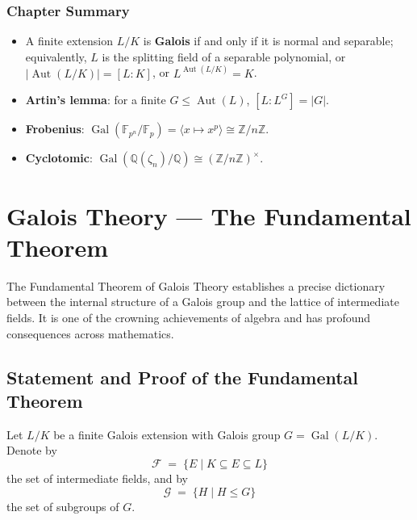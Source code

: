 \documentclass[12pt,a4paper,openany]{book}
\theoremstyle{definition}
\theoremstyle{remark}
\newcommand{\Z}{\mathbb{Z}}
\newcommand{\Q}{\mathbb{Q}}
\newcommand{\F}{\mathbb{F}}
\DeclareMathOperator{\Gal}{Gal}
\DeclareMathOperator{\Aut}{Aut}
\begin{document}
\subsection*{Chapter Summary}

\begin{itemize}
\item A finite extension $L/K$ is \textbf{Galois} if and only if it is normal
and separable; equivalently, $L$ is the splitting field of a separable
polynomial, or $|\!\Aut(L/K)|=[L:K]$, or $L^{\Aut(L/K)}=K$.
\item \textbf{Artin's lemma}: for a finite $G\leq\Aut(L)$, $[L:L^{G}]=|G|$.
\item \textbf{Frobenius}: $\Gal(\F_{p^{n}}/\F_{p})=\langle x\mapsto
x^{p}\rangle\cong\Z/n\Z$.
\item \textbf{Cyclotomic}: $\Gal(\Q(\zeta_{n})/\Q)\cong(\Z/n\Z)^{\times}$.
\end{itemize}


\chapter{Galois Theory — The Fundamental Theorem}
\label{ch:fundamental-theorem}

The Fundamental Theorem of Galois Theory establishes a precise dictionary
between the internal structure of a Galois group and the lattice of
intermediate fields.  It is one of the crowning achievements of algebra and
has profound consequences across mathematics.

\section{Statement and Proof of the Fundamental Theorem}
\label{sec:ftgt}

Let $L/K$ be a finite Galois extension with Galois group $G=\Gal(L/K)$.
Denote by
\[
  \mathcal{F} \;=\; \{E \mid K\subseteq E\subseteq L\}
\]
the set of intermediate fields, and by
\[
  \mathcal{G} \;=\; \{H \mid H\leq G\}
\]
the set of subgroups of $G$.
\end{document}
